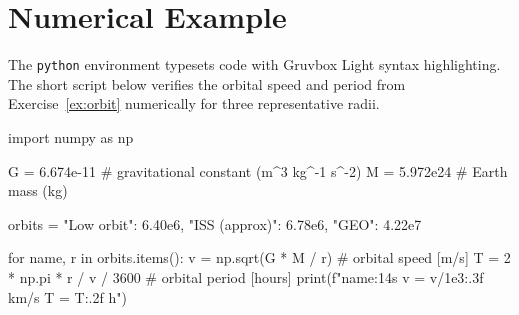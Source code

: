 \documentclass[11pt]{article}
\begin{document}
\section{Numerical Example}

The \verb|python| environment typesets code with Gruvbox Light
syntax highlighting. The short script below verifies the orbital
speed and period from Exercise~\ref{ex:orbit} numerically for three representative
radii.

\begin{python}
import numpy as np

G = 6.674e-11   # gravitational constant  (m^3 kg^-1 s^-2)
M = 5.972e24    # Earth mass              (kg)

orbits = {"Low orbit":    6.40e6,
          "ISS (approx)": 6.78e6,
          "GEO":          4.22e7}

for name, r in orbits.items():
    v = np.sqrt(G * M / r)           # orbital speed  [m/s]
    T = 2 * np.pi * r / v / 3600    # orbital period [hours]
    print(f"{name:14s}  v = {v/1e3:.3f} km/s   T = {T:.2f} h")
\end{python}
\end{document}
